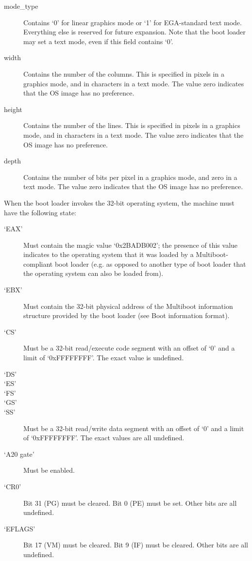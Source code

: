 \begin{description}
\item[mode\_type]
Contains ‘0’ for linear graphics mode or ‘1’ for EGA-standard text mode.
Everything else is reserved for future expansion. Note that the boot loader may
set a text mode, even if this field contains ‘0’.
\item[width]
Contains the number of the columns. This is specified in pixels in a graphics
mode, and in characters in a text mode. The value zero indicates that the OS
image has no preference.
\item[height]
Contains the number of the lines. This is specified in pixels in a graphics
mode, and in characters in a text mode. The value zero indicates that the OS
image has no preference.
\item[depth]
Contains the number of bits per pixel in a graphics mode, and zero in a text
mode. The value zero indicates that the OS image has no
preference.
\end{description}

\secup


When the boot loader invokes the 32-bit operating system, the machine must have
the following state:

\begin{description}
\item[‘EAX’]
Must contain the magic value ‘0x2BADB002’; the presence of this value indicates
to the operating system that it was loaded by a Multiboot-compliant boot loader
(e.g. as opposed to another type of boot loader that the operating system can
also be loaded from).
\item[‘EBX’]
Must contain the 32-bit physical address of the Multiboot information structure
provided by the boot loader (see Boot information format).
\item[‘CS’]
Must be a 32-bit read/execute code segment with an offset of ‘0’ and a limit of
‘0xFFFFFFFF’. The exact value is undefined.
\item[‘DS’]
\item[‘ES’]
\item[‘FS’]
\item[‘GS’]
\item[‘SS’]
Must be a 32-bit read/write data segment with an offset of ‘0’ and a limit of
‘0xFFFFFFFF’. The exact values are all undefined.
\item[‘A20 gate’]
Must be enabled. 
\item[‘CR0’]
Bit 31 (PG) must be cleared. Bit 0 (PE) must be set. Other bits are all
undefined.
\item[‘EFLAGS’]
Bit 17 (VM) must be cleared. Bit 9 (IF) must be cleared. Other bits are all
undefined.
\end{description}


